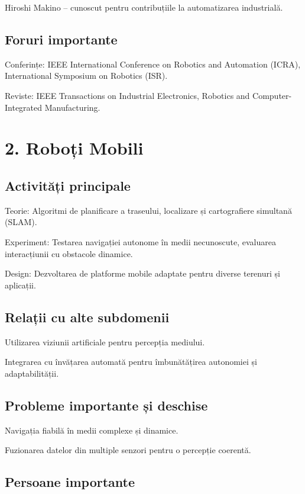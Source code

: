 \documentclass[12pt]{article}
\begin{document}
Hiroshi Makino – cunoscut pentru contribuțiile la automatizarea industrială.

\subsection*{Foruri importante}

Conferințe: IEEE International Conference on Robotics and Automation (ICRA), International Symposium on Robotics (ISR).

Reviste: IEEE Transactions on Industrial Electronics, Robotics and Computer-Integrated Manufacturing.

\section{2. Roboți Mobili}

\subsection*{Activități principale}

Teorie: Algoritmi de planificare a traseului, localizare și cartografiere simultană (SLAM).

Experiment: Testarea navigației autonome în medii necunoscute, evaluarea interacțiunii cu obstacole dinamice.

Design: Dezvoltarea de platforme mobile adaptate pentru diverse terenuri și aplicații.

\subsection*{Relații cu alte subdomenii}

Utilizarea viziunii artificiale pentru percepția mediului.

Integrarea cu învățarea automată pentru îmbunătățirea autonomiei și adaptabilității.

\subsection*{Probleme importante și deschise}

Navigația fiabilă în medii complexe și dinamice.

Fuzionarea datelor din multiple senzori pentru o percepție coerentă.

\subsection*{Persoane importante}
\end{document}

